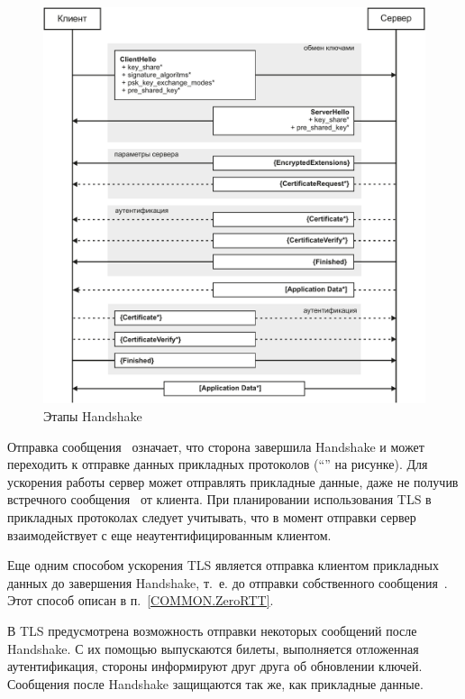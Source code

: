 \begin{figure}[hbt]
\begin{center}
\includegraphics[width=15cm]{../figs/Phases}
\end{center}
\caption{Этапы Handshake}\label{Fig.COMMON.Phases}
\end{figure}

Отправка сообщения~ означает, что сторона завершила
Handshake и может переходить к отправке данных прикладных протоколов
(``'' на рисунке). Для ускорения работы сервер может
отправлять прикладные данные, даже не получив встречного
сообщения~ от клиента. При планировании использования TLS 
в прикладных протоколах следует учитывать, что в момент отправки сервер
взаимодействует с еще неаутентифицированным клиентом.

Еще одним способом ускорения TLS является отправка клиентом прикладных данных до
завершения Handshake, т.~е. до отправки собственного 
сообщения~. Этот способ описан в п.~\ref{COMMON.ZeroRTT}. 

В TLS предусмотрена возможность отправки некоторых сообщений после Handshake. 
С их помощью выпускаются билеты, выполняется отложенная аутентификация, 
стороны информируют друг друга об обновлении ключей. Сообщения после Handshake 
защищаются так же, как прикладные данные.

